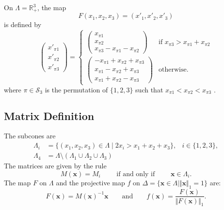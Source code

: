 On $\Lambda=\mathbb{R}^3_+$, the map
\[
F (x_1,x_2,x_3) = (x'_1,x'_2,x'_3)
\]
is defined by
\[
\left(\begin{array}{r}
	x'_{\pi 1} \\
	x'_{\pi 2} \\
	x'_{\pi 3}
\end{array}\right) =
\begin{cases}
\left(\begin{array}{l}
    x_{\pi 1}\\
    x_{\pi 2}\\
    x_{\pi 3}-x_{\pi 1}-x_{\pi 2}
\end{array}\right)
    &\mbox{if } x_{\pi 3}>x_{\pi 1}+x_{\pi 2}\\
\left(\begin{array}{r}
     -x_{\pi 1}+x_{\pi 2}+x_{\pi 3}\\
      x_{\pi 1}-x_{\pi 2}+x_{\pi 3}\\
      x_{\pi 1}+x_{\pi 2}-x_{\pi 3}
\end{array}\right)
     &\mbox{otherwise.}
\end{cases}
\]
where $\pi\in\mathcal{S}_3$ is the permutation of $\{1,2,3\}$ such that
$x_{\pi 1}<x_{\pi 2}<x_{\pi 3}$
\cite{arnoux_symmetric_2015}.
\subsection{Matrix Definition}
The subcones are
\begin{align*}
	\Lambda_i &= \{(x_1,x_2,x_3)\in\Lambda\mid 
	2x_i > x_1+x_2+x_3\},
	&i\in\{1,2,3\},\\
	\Lambda_4 &= \Lambda\setminus(\Lambda_1\cup\Lambda_2\cup\Lambda_3)
\end{align*}
The matrices are given by the rule
\[
    M(\mathbf{x}) = M_i
    \qquad\text{ if and only if }\qquad
    \mathbf{x}\in\Lambda_i.
\]
The map $F$ on $\Lambda$ and
the projective map $f$ on
$\Delta=\{\mathbf{x}\in\Lambda\mid\Vert\mathbf{x}\Vert_1=1\}$ are:
\[
    F(\mathbf{x}) = M(\mathbf{x})^{-1}\mathbf{x}
    \qquad\text{and}\qquad
    f(\mathbf{x}) = \frac{F(\mathbf{x})}{\Vert F(\mathbf{x})\Vert_1}.
\]
